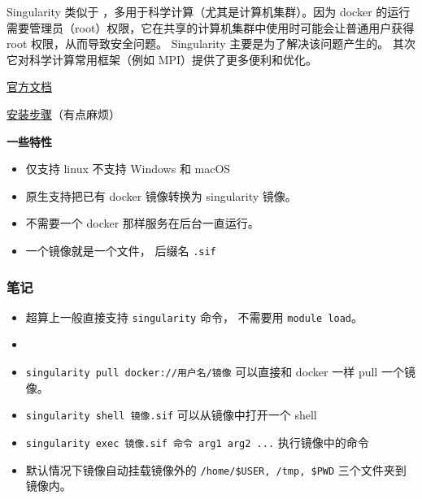
\begin{issues}
\issueDraft
\end{issues}

Singularity 类似于 ，多用于科学计算（尤其是计算机集群）。因为 docker 的运行需要管理员（root）权限，它在共享的计算机集群中使用时可能会让普通用户获得 root 权限，从而导致安全问题。 Singularity 主要是为了解决该问题产生的。 其次它对科学计算常用框架（例如 MPI）提供了更多便利和优化。

\href{https://docs.sylabs.io/guides/3.0/user-guide/index.html}{官方文档}

\href{https://docs.sylabs.io/guides/3.0/user-guide/quick_start.html#quick-installation-steps}{安装步骤}（有点麻烦）

\textbf{一些特性}
\begin{itemize}
\item 仅支持 linux 不支持 Windows 和 macOS
\item 原生支持把已有 docker 镜像转换为 singularity 镜像。
\item 不需要一个 docker 那样服务在后台一直运行。
\item 一个镜像就是一个文件， 后缀名 \verb`.sif`
\end{itemize}


\subsubsection{笔记}
\begin{itemize}
\item 超算上一般直接支持 \verb`singularity` 命令， 不需要用 \verb`module load`。
\item \item \verb`singularity pull docker://用户名/镜像` 可以直接和 docker 一样 pull 一个镜像。
\item \verb`singularity shell 镜像.sif` 可以从镜像中打开一个 shell
\item \verb`singularity exec 镜像.sif 命令 arg1 arg2 ...` 执行镜像中的命令
\item 默认情况下镜像自动挂载镜像外的 \verb`/home/$USER, /tmp, $PWD` 三个文件夹到镜像内。
\end{itemize}
